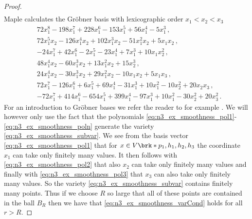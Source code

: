 \begin{proof}
\begin{align}
  \end{align}
  Maple calculates the Gröbner basis with lexicographic order $x_1<x_2<x_3$
  \begin{align}
    & 72x_1^8 - 198x_1^7 + 228x_1^6 - 153x_1^5 + 56x_1^4 - 5x_1^3\,,\label{eq:n3_ex_smoothness_pol1} \\
    & 72x_1^5x_2 - 126x_1^4x_2 + 102x_1^3x_2 - 51x_1^2x_2 + 5x_1x_2\,, \label{eq:n3_ex_smoothness_pol2}\\
    & -24x_1^7 + 42x_1^6 - 2x_1^5 - 23x_1^4 + 7x_1^3 + 10x_1x_2^2\,, \label{eq:n3_ex_smoothness_pol3} \\
    & 48x_1^4x_2 - 60x_1^3x_2 + 13x_1^2x_2 + 15x_2^3\,, \\
    & 24x_1^4x_2 - 30x_1^3x_2 + 29x_1^2x_2 - 10x_1x_2 + 5x_1x_3\,, \\
    & 72x_1^7 - 126x_1^6 + 6x_1^5 + 69x_1^4 - 31x_1^3 + 10x_1^2 - 10x_2^2 + 20x_2x_3\,, \\
    & -72x_1^7 + 414x_1^6 - 654x_1^5 + 399x_1^4 - 97x_1^3 + 10x_1^2 - 30x_2^2 + 20x_3^2\,.\label{eq:n3_ex_smoothness_poln}
  \end{align}
  For an introduction to Gröbner bases we refer the reader to for example \cite{Cox2015}.
  We will however only use the fact that the polynomials \eqref{eq:n3_ex_smoothness_pol1}-\eqref{eq:n3_ex_smoothness_poln}
  generate the variety \eqref{eq:n3_ex_smoothness_subvar}.
  We see from the basis vector \eqref{eq:n3_ex_smoothness_pol1} that
  for $x\in V\brk*{p_1,h_1,h_2,h_3}$ the coordinate $x_1$ can take only finitely many values.
  It then follows with \eqref{eq:n3_ex_smoothness_pol2} that also $x_2$ can take only finitely many values
  and finally with \eqref{eq:n3_ex_smoothness_pol3} that $x_3$ can also take only finitely many values.
  So the variety \eqref{eq:n3_ex_smoothness_subvar} contains finitely many points.
  Thus if we choose $R$ so large that all of these points are contained in the ball $B_R$ then we have
  that \eqref{eq:n3_ex_smoothness_varCond} holds for all $r>R$.
\end{proof}
